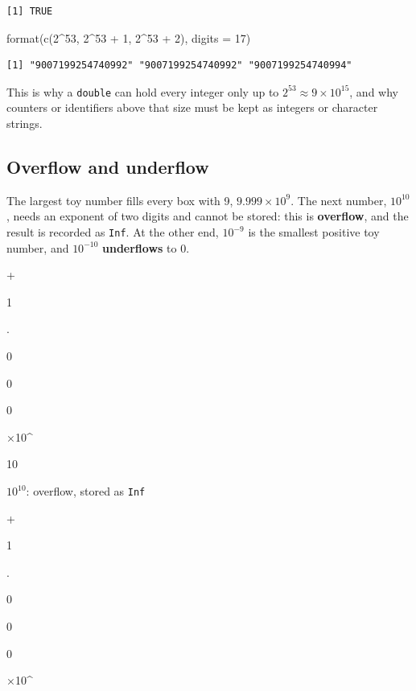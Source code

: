 \documentclass[
  letterpaper,
  DIV=11,
  numbers=noendperiod]{scrreprt}
\newenvironment{Shaded}{\begin{snugshade}}{\end{snugshade}}
\newcommand{\AttributeTok}[1]{\textcolor[rgb]{0.40,0.45,0.13}{#1}}
\newcommand{\DecValTok}[1]{\textcolor[rgb]{0.68,0.00,0.00}{#1}}
\newcommand{\FunctionTok}[1]{\textcolor[rgb]{0.28,0.35,0.67}{#1}}
\newcommand{\NormalTok}[1]{\textcolor[rgb]{0.00,0.23,0.31}{#1}}
\newcommand{\SpecialCharTok}[1]{\textcolor[rgb]{0.37,0.37,0.37}{#1}}
\begin{document}
\begin{verbatim}
[1] TRUE
\end{verbatim}

\begin{Shaded}
\begin{Highlighting}[]
\FunctionTok{format}\NormalTok{(}\FunctionTok{c}\NormalTok{(}\DecValTok{2}\SpecialCharTok{\^{}}\DecValTok{53}\NormalTok{, }\DecValTok{2}\SpecialCharTok{\^{}}\DecValTok{53} \SpecialCharTok{+} \DecValTok{1}\NormalTok{, }\DecValTok{2}\SpecialCharTok{\^{}}\DecValTok{53} \SpecialCharTok{+} \DecValTok{2}\NormalTok{), }\AttributeTok{digits =} \DecValTok{17}\NormalTok{)}
\end{Highlighting}
\end{Shaded}

\begin{verbatim}
[1] "9007199254740992" "9007199254740992" "9007199254740994"
\end{verbatim}

This is why a \texttt{double} can hold every integer only up to
\(2^{53}\approx 9\times10^{15}\), and why counters or identifiers above
that size must be kept as integers or character strings.

\subsection{Overflow and underflow}\label{overflow-and-underflow}

The largest toy number fills every box with 9, \(9.999\times10^{9}\).
The next number, \(10^{10}\), needs an exponent of two digits and cannot
be stored: this is \textbf{overflow}, and the result is recorded as
\texttt{Inf}. At the other end, \(10^{-9}\) is the smallest positive toy
number, and \(10^{-10}\) \textbf{underflows} to \(0\).

+

1

.

0

0

0

×10\^{}

10

\(10^{10}\): overflow, stored as \texttt{Inf}

+

1

.

0

0

0

×10\^{}
\end{document}

